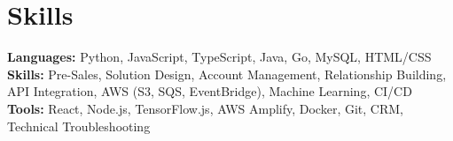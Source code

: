 \documentclass[11pt]{article}       %
\begin{document}
\vspace{-18.5pt}


\section*{Skills}
\textbf{Languages:} Python, JavaScript, TypeScript, Java, Go, MySQL, HTML/CSS\\
\textbf{Skills:} Pre-Sales, Solution Design, Account Management, Relationship Building, API Integration, AWS (S3, SQS, EventBridge), Machine Learning, CI/CD\\
\textbf{Tools:} React, Node.js, TensorFlow.js, AWS Amplify, Docker, Git, CRM, Technical Troubleshooting\\

\vspace{-6.5pt}
\end{document}
